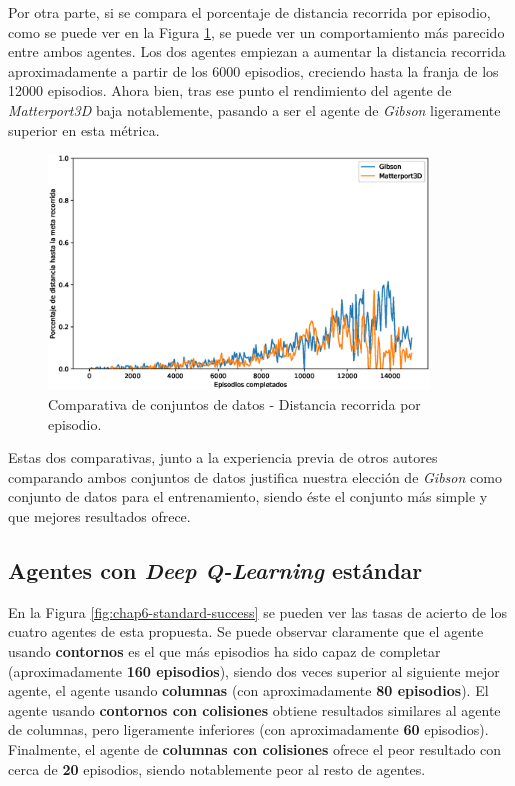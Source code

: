 Por otra parte, si se compara el porcentaje de distancia recorrida por episodio, como se puede ver en la Figura \ref{fig:chap6-dataset-distance}, se puede ver un comportamiento más parecido entre ambos agentes. Los dos agentes empiezan a aumentar la distancia recorrida aproximadamente a partir de los 6000 episodios, creciendo hasta la franja de los 12000 episodios. Ahora bien, tras ese punto el rendimiento del agente de \textit{Matterport3D} baja notablemente, pasando a ser el agente de \textit{Gibson} ligeramente superior en esta métrica.

\begin{figure}[h]
    \centering
    \includegraphics[width=0.9\textwidth]{imagenes/cap6/dataset/smoothed_distances.eps}
    \caption{Comparativa de conjuntos de datos - Distancia recorrida por episodio.}
    \label{fig:chap6-dataset-distance}
\end{figure}

Estas dos comparativas, junto a la experiencia previa de otros autores comparando ambos conjuntos de datos \cite{habitat19iccv} justifica nuestra elección de \textit{Gibson} como conjunto de datos para el entrenamiento, siendo éste el conjunto más simple y que mejores resultados ofrece.

\subsection{Agentes con \textit{Deep Q-Learning} estándar}

En la Figura \ref{fig:chap6-standard-success} se pueden ver las tasas de acierto de los cuatro agentes de esta propuesta. Se puede observar claramente que el agente usando \textbf{contornos} es el que más episodios ha sido capaz de completar (aproximadamente \textbf{160 episodios}), siendo dos veces superior al siguiente mejor agente, el agente usando \textbf{columnas} (con aproximadamente \textbf{80 episodios}). El agente usando \textbf{contornos con colisiones} obtiene resultados similares al agente de columnas, pero ligeramente inferiores (con aproximadamente \textbf{60} episodios). Finalmente, el agente de \textbf{columnas con colisiones} ofrece el peor resultado con cerca de \textbf{20} episodios, siendo notablemente peor al resto de agentes.

